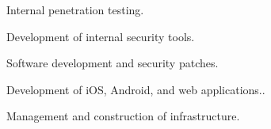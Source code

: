 \documentclass[letterpaper]{deedy-resume} %
\begin{document}
\begin{minipage}[t]{0.65\textwidth}

\vspace{\topsep} %
\begin{tightitemize}
\item Internal penetration testing.
\item Development of internal security tools.
\item Software development and security patches.
\end{tightitemize}

\sectionspace %
\sectionspace %


\vspace{\topsep} %
\begin{tightitemize}
\item Development of iOS, Android, and web applications..
\item Management and construction of infrastructure.
\end{tightitemize}

\sectionspace %
\sectionspace %

%
%



\end{minipage}
\end{document}

